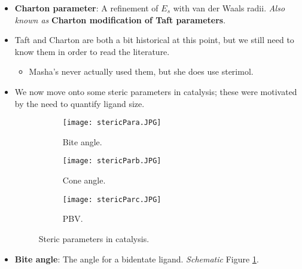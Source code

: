 \documentclass[../notes.tex]{subfiles}
\begin{document}
\begin{itemize}
\begin{itemize}
\begin{itemize}
        \end{itemize}
    \end{itemize}
    \item \textbf{Charton parameter}: A refinement of $E_s$ with van der Waals radii. \emph{Also known as} \textbf{Charton modification of Taft parameters}.
    \item Taft and Charton are both a bit historical at this point, but we still need to know them in order to read the literature.
    \begin{itemize}
        \item Masha's never actually used them, but she does use sterimol.
    \end{itemize}
    \item We now move onto some steric parameters in catalysis; these were motivated by the need to quantify ligand size.
    \begin{figure}[h!]
        \centering
        \begin{subfigure}[b]{0.2\linewidth}
            \centering
            \texttt{[image: stericPara.JPG]}
            \caption{Bite angle.}
            \label{fig:stericPara}
        \end{subfigure}
        \begin{subfigure}[b]{0.2\linewidth}
            \centering
            \texttt{[image: stericParb.JPG]}
            \caption{Cone angle.}
            \label{fig:stericParb}
        \end{subfigure}
        \begin{subfigure}[b]{0.2\linewidth}
            \centering
            \texttt{[image: stericParc.JPG]}
            \caption{PBV.}
            \label{fig:stericParc}
        \end{subfigure}
        \caption{Steric parameters in catalysis.}
        \label{fig:stericPar}
    \end{figure}
    \item \textbf{Bite angle}: The  angle for a bidentate ligand. \emph{Schematic} Figure \ref{fig:stericPara}.
    \begin{itemize}

\end{itemize}
\end{itemize}
\end{document}
